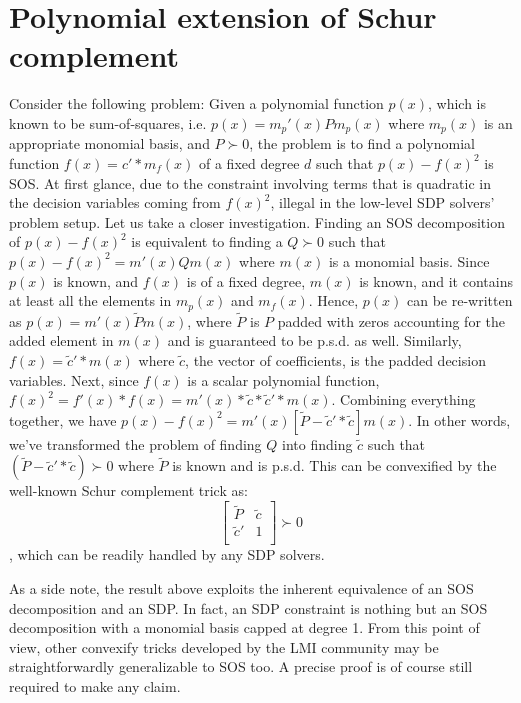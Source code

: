 \documentclass{article}
\begin{document}
\section{Polynomial extension of Schur complement} %
\label{sec:polynomial_extension_to_schur_complement}
Consider the following problem: Given a polynomial function $p(x)$, which is known to be sum-of-squares, i.e. $p(x)=m_p'(x)Pm_p(x)$ where $m_p(x)$ is an appropriate monomial basis, and $P\succ 0$, the problem is to find a polynomial function $f(x)=c'*m_f(x)$ of a fixed degree $d$ such that $p(x)-f(x)^2$ is SOS. At first glance, due to the constraint involving terms that is quadratic in the decision variables coming from $f(x)^2$, illegal in the low-level SDP solvers' problem setup. Let us take a closer investigation. Finding an SOS decomposition of $p(x)-f(x)^2$ is equivalent to finding a $Q \succ 0$ such that $p(x)-f(x)^2=m'(x)Qm(x)$ where $m(x)$ is a monomial basis. Since $p(x)$ is known, and $f(x)$ is of a fixed degree, $m(x)$ is known, and it contains at least all the elements in $m_p(x)$ and $m_f(x)$. Hence, $p(x)$ can be re-written as $p(x)=m'(x)\tilde{P}m(x)$, where $\tilde{P}$ is $P$ padded with zeros accounting for the added element in $m(x)$ and is guaranteed to be p.s.d. as well. Similarly, $f(x)=\tilde{c}'*m(x)$ where $\tilde{c}$, the vector of coefficients, is the padded decision variables. Next, since $f(x)$ is a scalar polynomial function, $f(x)^2=f'(x)*f(x)=m'(x)*\tilde{c}*\tilde{c}'*m(x)$. Combining everything together, we have $p(x)-f(x)^2=m'(x)[\tilde{P}-\tilde{c}'*\tilde{c}]m(x)$. In other words, we've transformed the problem of finding $Q$ into finding $\tilde{c}$ such that $(\tilde{P}-\tilde{c}'*\tilde{c})\succ 0$ where $\tilde{P}$ is known and is p.s.d. This can be convexified by the well-known Schur complement trick as:
\[
\begin{bmatrix}
  \tilde{P} & \tilde{c}\\
  \tilde{c}' & 1 \\
\end{bmatrix}\succ 0 \], which can be readily handled by any SDP solvers. 


As a side note, the result above exploits the inherent equivalence of an SOS decomposition and an SDP. In fact, an SDP constraint is nothing but an SOS decomposition with a monomial basis capped at degree 1. From this point of view, other convexify tricks developed by the LMI community may be straightforwardly generalizable to SOS too. A precise proof is of course still required to make any claim. 
\end{document}
